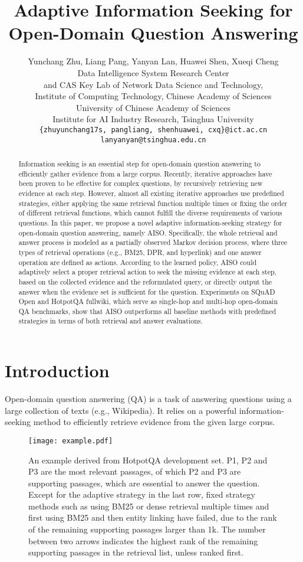 \documentclass[11pt]{article}
\title{Adaptive Information Seeking for Open-Domain Question Answering}
\author{Yunchang Zhu, Liang Pang, Yanyan Lan, Huawei Shen, Xueqi Cheng \\
    Data Intelligence System Research Center \\ 
    and CAS Key Lab of Network Data Science and Technology, \\
    Institute of Computing Technology, Chinese Academy of Sciences \\
    University of Chinese Academy of Sciences \\
    Institute for AI Industry Research, Tsinghua University \\
    \texttt{\{zhuyunchang17s, pangliang, shenhuawei, cxq\}@ict.ac.cn} \\
    \texttt{lanyanyan@tsinghua.edu.cn}
}
\begin{document}
\maketitle
\begin{abstract}
Information seeking is an essential step for open-domain question answering to efficiently gather evidence from a large corpus. 
Recently, iterative approaches have been proven to be effective for complex questions, by recursively retrieving new evidence at each step.
However, almost all existing iterative approaches use predefined strategies, either applying the same retrieval function multiple times or fixing the order of different retrieval functions, which cannot fulfill the diverse requirements of various questions. 
In this paper, we propose a novel adaptive information-seeking strategy for open-domain question answering, namely AISO. 
Specifically, the whole retrieval and answer process is modeled as a partially observed Markov decision process, where three types of retrieval operations (e.g., BM25, DPR, and hyperlink) and one answer operation are defined as actions.
According to the learned policy, AISO could adaptively select a proper retrieval action to seek the missing evidence at each step, based on the collected evidence and the reformulated query, or directly output the answer when the evidence set is sufficient for the question.
Experiments on SQuAD Open and HotpotQA fullwiki, which serve as single-hop and multi-hop open-domain QA benchmarks, show that AISO outperforms all baseline methods with predefined strategies in terms of both retrieval and answer evaluations. 
\let\thefootnote\relax{}
\end{abstract}


\section{Introduction}
Open-domain question answering (QA) \citep{voorhees1999trec} is a task of answering questions using a large collection of texts (e.g., Wikipedia). 
It relies on a powerful information-seeking method to efficiently retrieve evidence from the given large corpus.

\begin{figure}
    \centering
    \texttt{[image: example.pdf]}
    \caption{An example derived from HotpotQA development set. P1, P2 and P3 are the most relevant passages, of which P2 and P3 are supporting passages, which are essential to answer the question. Except for the adaptive strategy in the last row, fixed strategy methods such as using BM25 or dense retrieval multiple times and first using BM25 and then entity linking have failed, due to the rank of the remaining supporting passages larger than 1k. The number between two arrows indicates the highest rank of the remaining supporting passages in the retrieval list, unless ranked first.}
    \label{fig:exmaple}
\end{figure}
\end{document}
